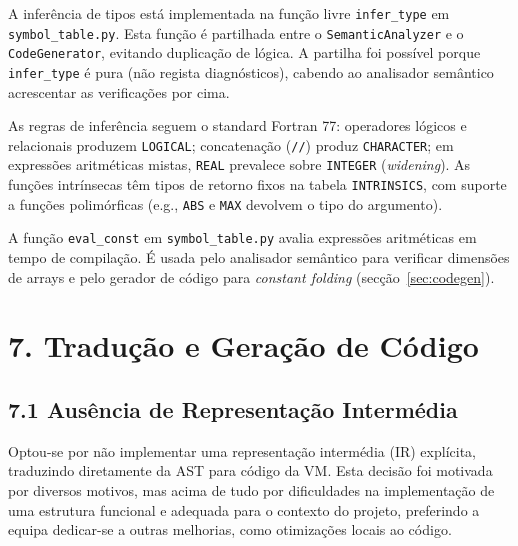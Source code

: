 \documentclass[a4paper]{article}
\begin{document}
\noindent A inferência de tipos está implementada na função livre \texttt{infer\_type} em \texttt{symbol\_table.py}. Esta função é partilhada entre o \texttt{SemanticAnalyzer} e o \texttt{CodeGenerator}, evitando duplicação de lógica. A partilha foi possível porque \texttt{infer\_type} é pura (não regista diagnósticos), cabendo ao analisador semântico acrescentar as verificações por cima.

\vspace{0.2cm}

\noindent As regras de inferência seguem o standard Fortran 77: operadores lógicos e relacionais produzem \texttt{LOGICAL}; concatenação (\texttt{//}) produz \texttt{CHARACTER}; em expressões aritméticas mistas, \texttt{REAL} prevalece sobre \texttt{INTEGER} (\textit{widening}). As funções intrínsecas têm tipos de retorno fixos na tabela \texttt{INTRINSICS}, com suporte a funções polimórficas (e.g., \texttt{ABS} e \texttt{MAX} devolvem o tipo do argumento).

\vspace{0.2cm}

\noindent A função \texttt{eval\_const} em \texttt{symbol\_table.py} avalia expressões aritméticas em tempo de compilação. É usada pelo analisador semântico para verificar dimensões de arrays e pelo gerador de código para \textit{constant folding} (secção~\ref{sec:codegen}).

\section*{7. Tradução e Geração de Código}
\label{sec:codegen}

\subsection*{7.1 Ausência de Representação Intermédia}

\noindent Optou-se por não implementar uma representação intermédia (IR) explícita, traduzindo diretamente da AST para código da VM. Esta decisão foi motivada por diversos motivos, mas acima de tudo por dificuldades na implementação de uma estrutura funcional e adequada para o contexto do projeto, preferindo a equipa dedicar-se a outras melhorias, como otimizações locais ao código.
\end{document}
